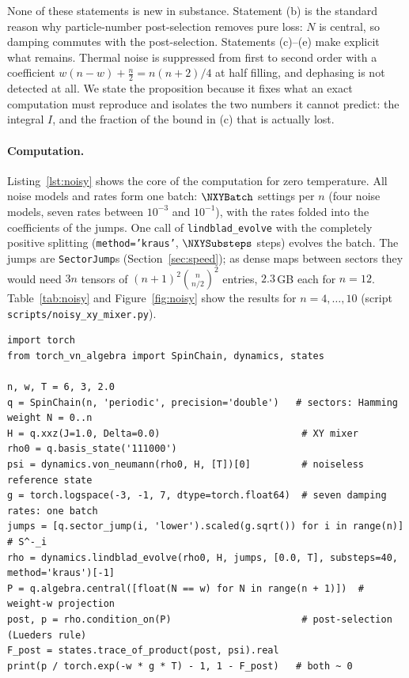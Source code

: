 \documentclass[11pt]{article}
\begin{document}
\noindent None of these statements is new in substance. Statement (b) is the standard reason why particle-number
post-selection removes pure loss: $N$ is central, so damping commutes with the post-selection. Statements (c)--(e)
make explicit what remains. Thermal noise is suppressed from first to second order with a coefficient
$w(n-w)+\frac n2=n(n+2)/4$ at half filling, and dephasing is not detected at all. We state the proposition because it
fixes what an exact computation must reproduce and isolates the two numbers it cannot predict: the integral $I$, and the
fraction of the bound in (c) that is actually lost.

\paragraph{Computation.} Listing~\ref{lst:noisy} shows the core of the computation for zero temperature. All noise
models and rates form one batch: $\NXYBatch$ settings per $n$ (four noise models, seven rates between $10^{-3}$ and
$10^{-1}$), with the rates folded into the coefficients of the jumps. One call of \texttt{lindblad\_evolve} with the
completely positive splitting (\texttt{method='kraus'}, $\NXYSubsteps$ steps) evolves the batch. The jumps are
\texttt{SectorJump}s (Section~\ref{sec:speed}); as dense maps between sectors they would need $3n$ tensors of
$(n+1)^2\binom n{n/2}^2$ entries, $2.3$\,GB each for $n=12$. Table~\ref{tab:noisy} and Figure~\ref{fig:noisy} show the
results for $n=4,\dots,10$ (script \texttt{scripts/noisy\_xy\_mixer.py}).

\begin{lstlisting}[float=t, caption={Amplitude damping of a six-qubit XY mixer for seven rates in one batch, and
post-selection on the Hamming weight (Proposition~\ref{prop:noisy}(b)): both printed deviations are at the level of the
time-step error and of round-off.}, label=lst:noisy]
import torch
from torch_vn_algebra import SpinChain, dynamics, states

n, w, T = 6, 3, 2.0
q = SpinChain(n, 'periodic', precision='double')   # sectors: Hamming weight N = 0..n
H = q.xxz(J=1.0, Delta=0.0)                         # XY mixer
rho0 = q.basis_state('111000')
psi = dynamics.von_neumann(rho0, H, [T])[0]         # noiseless reference state
g = torch.logspace(-3, -1, 7, dtype=torch.float64)  # seven damping rates: one batch
jumps = [q.sector_jump(i, 'lower').scaled(g.sqrt()) for i in range(n)]   # S^-_i
rho = dynamics.lindblad_evolve(rho0, H, jumps, [0.0, T], substeps=40, method='kraus')[-1]
P = q.algebra.central([float(N == w) for N in range(n + 1)])  # weight-w projection
post, p = rho.condition_on(P)                       # post-selection (Lueders rule)
F_post = states.trace_of_product(post, psi).real
print(p / torch.exp(-w * g * T) - 1, 1 - F_post)   # both ~ 0
\end{lstlisting}
\end{document}
